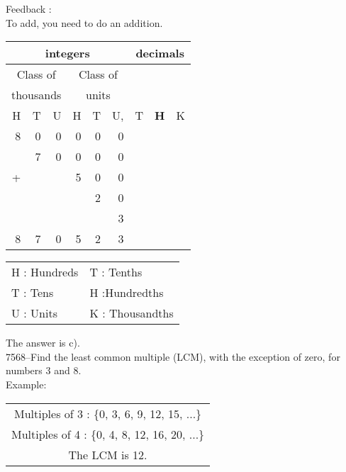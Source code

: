 \documentclass[letterpaper, 12pt]{article}
\begin{document}
Feedback :\\
To add, you need to do an addition.
\begin{center}
\begin{tabular}{|rrr|rrr|rrr|}
\hline
\multicolumn{6}{|c|}{integers} &\multicolumn{3}{|c|}{decimals} \\
\hline
\multicolumn{3}{|c|}{Class of} &\multicolumn{3}{|c|}{Class of} &  \multicolumn{3}{c|}{} \\
\multicolumn{3}{|c|}{thousands} &\multicolumn{3}{|c|}{units} &  \multicolumn{3}{c|}{} \\
\hline
H & T & U &H & T & U, & T\up{th} & \textbf{H\up{th}} & K\up{th} \\
\hline
\hline
8 & 0 & 0 & 0 & 0 & 0 &  & &\\
 & 7 & 0 & 0 & 0 & 0 &  & &\\
+ &  &  & 5 & 0 & 0 &  & &\\
 &  &  &  & 2 & 0 &  & &\\
 &  &  &  &  & 3 &  & &\\
\hline
\hline
 8 & 7 & 0 & 5 & 2 & 3 &  & &
\\
\hline
\end{tabular}
\end{center}

\scriptsize
\begin{center}
\begin{tabular}{ll}
H : Hundreds & T\up{th} : Tenths\\
T : Tens & H\up{th} :Hundredths\\
U : Units & K\up{e} : Thousandths\\
\end{tabular}
\end{center}

\normalsize
The answer is c).\\


7568--Find the least common multiple (LCM), with the exception of zero, for numbers 3 and 8.\\
Example:\\
\begin{center}
\begin{tabular}{|c|}
\hline
Multiples of 3 : \{0, 3, 6, 9, 12, 15, ...\}\\
Multiples of 4 : \{0, 4, 8, 12, 16, 20, ...\}\\
The LCM is 12.\\
\hline
\end{tabular}
\end{center}
\end{document}
